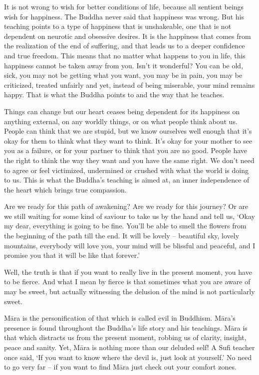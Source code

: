 It is not wrong to wish for better conditions of life, because all sentient beings wish for happiness. The Buddha never said that happiness was wrong. But his teaching points to a type of happiness that is unshakeable, one that is not dependent on neurotic and obsessive desires. It is the happiness that comes from the realization of the end of suffering, and that leads us to a deeper confidence and true freedom. This means that no matter what happens to you in life, this happiness cannot be taken away from you. Isn't it wonderful? You can be old, sick, you may not be getting what you want, you may be in pain, you may be criticized, treated unfairly and yet, instead of being miserable, your mind remains happy. That is what the Buddha points to and the way that he teaches. 

Things can change but our heart ceases being dependent for its happiness on anything external, on any worldly things, or on what people think about us. People can think that we are stupid, but we know ourselves well enough that it's okay for them to think what they want to think. It's okay for your mother to see you as a failure, or for your partner to think that you are no good. People have the right to think the way they want and you have the same right. We don't need to agree or feel victimized, undermined or crushed with what the world is doing to us. This is what the Buddha's teaching is aimed at, an inner independence of the heart which brings true compassion. 

Are we ready for this path of awakening? Are we ready for this journey? Or are we still waiting for some kind of saviour to take us by the hand and tell us, `Okay my dear, everything is going to be fine. You'll be able to smell the flowers from the beginning of the path till the end. It will be lovely -- beautiful sky, lovely mountains, everybody will love you, your mind will be blissful and peaceful, and I promise you that it will be like that forever.' 

Well, the truth is that if you want to really live in the present moment, you have to be fierce. And what I mean by fierce is that sometimes what you are aware of may be sweet, but actually witnessing the delusion of the mind is not particularly sweet.

M\=ara is the personification of that which is called evil in Buddhism. M\=ara's presence is found throughout the Buddha's life story and his teachings. M\=ara is that which distracts us from the present moment, robbing us of clarity, insight, peace and sanity. Yet, M\=ara is nothing more than our deluded self! A Sufi teacher once said, `If you want to know where the devil is, just look at yourself.' No need to go very far -- if you want to find M\=ara just check out your comfort zones. 

